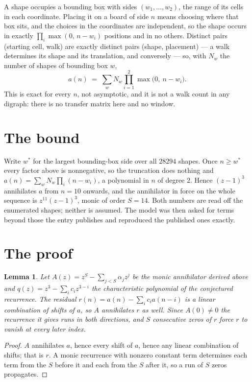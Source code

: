 \documentclass[11pt,a4paper]{article}
\theoremstyle{plain}
\newtheorem{lemma}[theorem]{Lemma}
\theoremstyle{definition}
\begin{document}
A shape occupies a bounding box with sides $(w_1,\dots,w_{2})$, the range of its cells in each
coordinate. Placing it on a board of side $n$ means choosing where that box sits, and the
choices in the coordinates are independent, so the shape occurs in exactly
$\prod_{i}\max(0,\,n-w_i)$ positions and in no others. Distinct pairs (starting cell,
walk) are exactly distinct pairs (shape, placement) --- a walk determines its shape and its
translation, and conversely --- so, with $N_w$ the number of shapes of bounding box $w$,
\[
a(n)\;=\;\sum_{w} N_w \prod_{i=1}^{2}\max\bigl(0,\ n-w_i\bigr).
\]
This is exact for every $n$, not asymptotic, and it is not a walk count in any digraph: there is
no transfer matrix here and no window.

\section{The bound}

Write $w^\ast$ for the largest bounding-box side over all $28294$ shapes. Once $n\ge w^\ast$
every factor above is nonnegative, so the truncation does nothing and
$a(n)=\sum_w N_w\prod_i(n-w_i)$, a polynomial in $n$ of degree $2$. Hence $(z-1)^{3}$
annihilates $a$ from $n=10$ onwards, and the annihilator in force on the whole sequence is
$z^{11}(z-1)^{3}$, monic of order $S=14$. Both numbers are read off the enumerated
shapes; neither is assumed. The model was then asked for terms beyond those the entry publishes
and reproduced the published ones exactly.

\section{The proof}

\begin{lemma}\label{lem:crit}
Let $A(z)=z^S-\sum_{j<S}\alpha_jz^{j}$ be the monic annihilator derived above and
$q(z)=z^{3}-\sum_ic_iz^{3-i}$ the characteristic polynomial of the conjectured
recurrence. The residual $r(n)=a(n)-\sum_ic_ia(n-i)$ is a linear combination of shifts of $a$,
so $A$ annihilates $r$ as well. Since $A(0)\ne0$ the recurrence it gives runs in both
directions, and $S$ consecutive zeros of $r$ force $r$ to vanish at every later index.
\end{lemma}

\begin{proof}
$A$ annihilates $a$, hence every shift of $a$, hence any linear combination of shifts; that is
$r$. A monic recurrence with nonzero constant term determines each term from the $S$ before it
and each from the $S$ after it, so a run of $S$ zeros propagates.
\end{proof}
\end{document}
